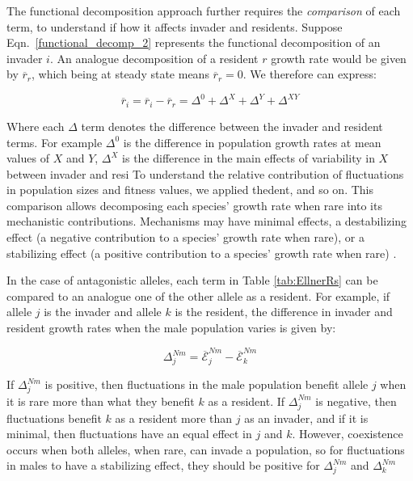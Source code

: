 \documentclass[]{article}
\begin{document}
The functional decomposition approach further requires the \textit{comparison} of each term, to understand if how it affects invader and residents. Suppose Eqn.~\ref{functional_decomp_2} represents the functional  decomposition of an invader $i$. An analogue decomposition of a resident $r$ growth rate would be given by $\overline{r}_{r}$, which being at steady state means $\overline{r}_{r}=0$. We therefore can express:


\begin{equation}
    \overline{r}_{i}= \overline{r}_{i} - \overline{r}_{r} = \Delta^{0} + \Delta^{X}+  \Delta^{Y}+ \Delta^{XY}
   \label{functional_decomp_3}
\end{equation}

Where each $\Delta$ term denotes the difference between the invader and resident terms. For example $\Delta^{0}$  is the difference in population growth rates at mean values of $X$ and $Y$, $\Delta^{X}$ is the difference in the main effects of variability in $X$ between invader and resi
To understand the relative contribution of fluctuations in population sizes and fitness values, we applied thedent, and so on. This comparison allows decomposing each species' growth rate when rare into its mechanistic contributions. Mechanisms may have minimal effects, a destabilizing effect (a negative contribution to a species' growth rate when rare), or a stabilizing effect (a positive contribution to a species' growth rate when rare) \citep{shoemaker2020}.

In the case of antagonistic alleles, each term in Table \ref{tab:EllnerRs} can be compared to an analogue one of the other allele as a resident. For example, if allele $j$ is the invader and allele $k$ is the resident, the difference in invader and resident growth rates when the male population varies is given by:


\begin{equation}
\Delta^{Nm}_{j}= \overline{\mathcal{E}}^{Nm}_{j} - \overline{\mathcal{E}}^{Nm}_{k}
\label{delta}
\end{equation}

If $\Delta^{Nm}_{j}$ is positive, then fluctuations in the male population benefit allele $j$ when it is rare more than what they benefit $k$ as a resident. If $\Delta^{Nm}_{j}$ is negative, then fluctuations benefit $k$ as a resident more than $j$ as an invader, and if it is minimal, then fluctuations have an equal effect in $j$ and $k$. However, coexistence occurs when both alleles, when rare, can invade a population, so for fluctuations in males to have a stabilizing effect, they should be positive for $\Delta^{Nm}_{j}$ and $\Delta^{Nm}_{k}$
\end{document}
